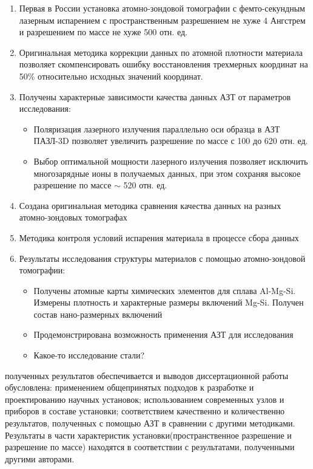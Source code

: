 \clearpage
{}
\begin{enumerate}[beginpenalty=10000] %
  \item Первая в России установка атомно-зондовой томографии с фемто-секундным лазерным испарением с пространственным разрешением не хуже 4 Ангстрем и разрешением по массе не хуже 500 отн. ед.
  \item Оригинальная методика коррекции данных по атомной плотности материала позволяет скомпенсировать ошибку восстановления трехмерных координат на 50\% относительно исходных значений координат.
  \item Получены характерные зависимости качества данных АЗТ от параметров исследования:
  \begin{itemize}
  	\item Поляризация лазерного излучения параллельно оси образца в АЗТ ПАЗЛ-3D позволяет увеличить разрешение по массе с 100 до 620 отн. ед.
  	\item Выбор оптимальной мощности лазерного излучения позволяет исключить многозарядные ионы в получаемых данных, при этом сохраняя высокое разрешение по массе $\sim$ 520 отн. ед.
  	\end{itemize}      
  \item Создана оригинальная методика сравнения качества данных на разных атомно-зондовых томографах
  \item Методика контроля условий испарения материала в процессе сбора данных
  \item Результаты исследования структуры материалов с помощью атомно-зондовой томографии:
  \begin{itemize}
  	\item Получены атомные карты химических элементов для сплава Al-Mg-Si. Измерены плотность и характерные размеры включений Mg-Si. Получен состав нано-размерных включений
  	\item Продемонстрирована возможность применения АЗТ для исследования   	
  	\item Какое-то исследование стали?
  \end{itemize}
  
  
\end{enumerate}

{\reliability} полученных результатов обеспечивается и выводов диссертационной работы обусловлена: применением общепринятых подходов к разработке и проектированию научных установок; использованием современных узлов и приборов в составе установки; соответствием качественно и количественно результатов, полученных с помощью АЗТ в сравнении с другими методиками. Результаты в части характеристик установки(пространственное разрешение и разрешение по массе) находятся в соответствии с результатами, полученными другими авторами.


